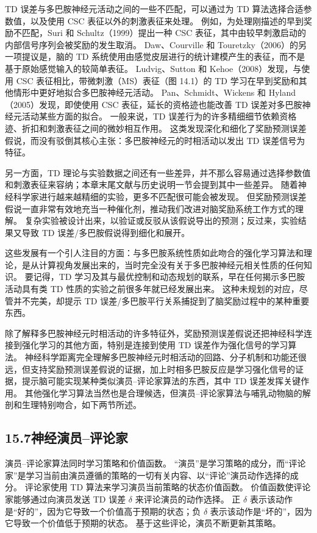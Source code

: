 \documentclass[UTF8,12pt,a4paper,fontset=fandol]{ctexart}
\begin{document}
TD 误差与多巴胺神经元活动之间的一些不匹配，可以通过为 TD 算法选择合适参数值，以及使用 CSC 表征以外的刺激表征来处理。
例如，为处理刚描述的早到奖励不匹配，Suri 和 Schultz（1999）提出一种 CSC 表征，其中由较早刺激启动的内部信号序列会被奖励的发生取消。
Daw、Courville 和 Touretzky（2006）的另一项提议是，脑的 TD 系统使用由感觉皮层进行的统计建模产生的表征，而不是基于原始感觉输入的较简单表征。
Ludvig、Sutton 和 Kehoe（2008）发现，与使用 CSC 表征相比，带微刺激（MS）表征（图 14.1）的 TD 学习在早到奖励和其他情形中更好地拟合多巴胺神经元活动。
Pan、Schmidt、Wickens 和 Hyland（2005）发现，即使使用 CSC 表征，延长的资格迹也能改善 TD 误差对多巴胺神经元活动某些方面的拟合。
一般来说，TD 误差行为的许多精细细节依赖资格迹、折扣和刺激表征之间的微妙相互作用。
这类发现深化和细化了奖励预测误差假说，而没有驳倒其核心主张：多巴胺神经元的时相活动以发出 TD 误差信号为特征。

另一方面，TD 理论与实验数据之间还有一些差异，并不那么容易通过选择参数值和刺激表征来容纳；本章末尾文献与历史说明一节会提到其中一些差异。
随着神经科学家进行越来越精细的实验，更多不匹配很可能会被发现。
但奖励预测误差假说一直非常有效地充当一种催化剂，推动我们改进对脑奖励系统工作方式的理解。
复杂实验被设计出来，以验证或反驳从该假说导出的预测；反过来，实验结果又导致 TD 误差/多巴胺假说得到细化和展开。

这些发展有一个引人注目的方面：与多巴胺系统性质如此吻合的强化学习算法和理论，是从计算视角发展出来的，当时完全没有关于多巴胺神经元相关性质的任何知识。
要记得，TD 学习及其与最优控制和动态规划的联系，早在任何揭示多巴胺活动具有类 TD 性质的实验之前很多年就已经发展出来。
这种未规划的对应，尽管并不完美，却提示 TD 误差/多巴胺平行关系捕捉到了脑奖励过程中的某种重要东西。

除了解释多巴胺神经元时相活动的许多特征外，奖励预测误差假说还把神经科学连接到强化学习的其他方面，特别是连接到使用 TD 误差作为强化信号的学习算法。
神经科学距离完全理解多巴胺神经元时相活动的回路、分子机制和功能还很远，但支持奖励预测误差假说的证据，加上时相多巴胺反应是学习强化信号的证据，提示脑可能实现某种类似演员--评论家算法的东西，其中 TD 误差发挥关键作用。
其他强化学习算法当然也是合理候选，但演员--评论家算法与哺乳动物脑的解剖和生理特别吻合，如下两节所述。

\subsection*{15.7\quad 神经演员--评论家}

演员--评论家算法同时学习策略和价值函数。
“演员”是学习策略的成分，而“评论家”是学习当前由演员遵循的策略的一切有关内容、以“评论”演员动作选择的成分。
评论家使用 TD 算法来学习演员当前策略的状态价值函数。
价值函数使评论家能够通过向演员发送 TD 误差 $\delta$ 来评论演员的动作选择。
正 $\delta$ 表示该动作是“好的”，因为它导致一个价值高于预期的状态；负 $\delta$ 表示该动作是“坏的”，因为它导致一个价值低于预期的状态。
基于这些评论，演员不断更新其策略。
\end{document}
